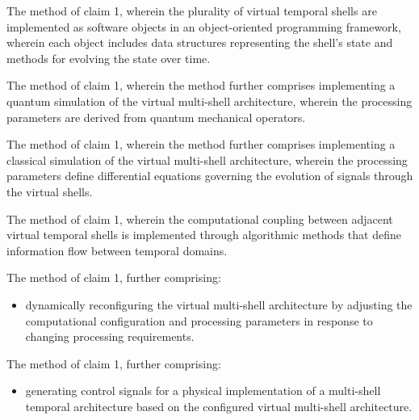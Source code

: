 \documentclass[12pt,letterpaper]{article}
\begin{document}
\begin{patentclaims}
    \item The method of claim 1, wherein the plurality of virtual temporal shells are implemented as software objects in an object-oriented programming framework, wherein each object includes data structures representing the shell's state and methods for evolving the state over time.
    
    \item The method of claim 1, wherein the method further comprises implementing a quantum simulation of the virtual multi-shell architecture, wherein the processing parameters are derived from quantum mechanical operators.
    
    \item The method of claim 1, wherein the method further comprises implementing a classical simulation of the virtual multi-shell architecture, wherein the processing parameters define differential equations governing the evolution of signals through the virtual shells.
    
    \item The method of claim 1, wherein the computational coupling between adjacent virtual temporal shells is implemented through algorithmic methods that define information flow between temporal domains.
    
    \item The method of claim 1, further comprising:
    \begin{itemize}[leftmargin=2em]
        \item dynamically reconfiguring the virtual multi-shell architecture by adjusting the computational configuration and processing parameters in response to changing processing requirements.
    \end{itemize}
    
    \item The method of claim 1, further comprising:
    \begin{itemize}[leftmargin=2em]
        \item generating control signals for a physical implementation of a multi-shell temporal architecture based on the configured virtual multi-shell architecture.
    \end{itemize}
    

\end{patentclaims}
\end{document}
